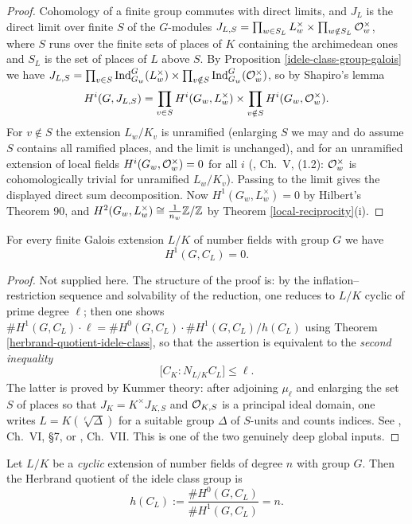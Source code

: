 \begin{proof}
Cohomology of a finite group commutes with direct limits, and $J_L$ is the
direct limit over finite $S$ of the $G$-modules
$J_{L,S}=\prod_{w\in S_L}L_w^\times\times\prod_{w\notin S_L}{\mathcal {O}}_w^\times$, where
$S$ runs over the finite sets of places of $K$ containing the archimedean ones
and $S_L$ is the set of places of $L$ above $S$.
By Proposition \ref{idele-class-group-galois} we have
$J_{L,S}=\prod_{v\in S}{\mathrm{Ind}}_{G_w}^G(L_w^\times)\times
\prod_{v\notin S}{\mathrm{Ind}}_{G_w}^G({\mathcal {O}}_w^\times)$, so by Shapiro's lemma
$$H^i(G,J_{L,S})=\prod_{v\in S}H^i(G_w,L_w^\times)\times
\prod_{v\notin S}H^i(G_w,{\mathcal {O}}_w^\times).$$
For $v\notin S$ the extension $L_w/K_v$ is unramified (enlarging $S$ we may and
do assume $S$ contains all ramified places, and the limit is unchanged), and for
an unramified extension of local fields $H^i(G_w,{\mathcal {O}}_w^\times)=0$ for all $i$
(\cite{Neu99}, Ch.~V, (1.2): ${\mathcal {O}}_w^\times$ is cohomologically trivial for
unramified $L_w/K_v$).
Passing to the limit gives the displayed direct sum decomposition.
Now $H^1(G_w,L_w^\times)=0$ by Hilbert's Theorem 90, and
$H^2(G_w,L_w^\times)\cong\frac1{n_w}{\mathbb {Z}}/{\mathbb {Z}}$ by
Theorem \ref{local-reciprocity}(i).
\end{proof}

\begin{thm}
\label{idele-class-H1-vanishes}
For every finite Galois extension $L/K$ of number fields with group $G$ we have
$$H^1(G,C_L)=0 .$$
\end{thm}

\begin{proof}
Not supplied here. The structure of the proof is:
by the inflation--restriction sequence and solvability of the reduction, one
reduces to $L/K$ cyclic of prime degree $\ell$; then one shows
$\#H^1(G,C_L)\cdot\ell=\#H^0(G,C_L)\cdot\#H^1(G,C_L)/h(C_L)$ using
Theorem \ref{herbrand-quotient-idele-class}, so that the assertion is
equivalent to the \emph{second inequality}
$$\big[C_K:N_{L/K}C_L\big]\leq\ell .$$
The latter is proved by Kummer theory: after adjoining $\mu_\ell$ and enlarging
the set $S$ of places so that $J_K=K^\times J_{K,S}$ and ${\mathcal {O}}_{K,S}$ is a
principal ideal domain, one writes $L=K(\sqrt[\ell]{\Delta})$ for a suitable
group $\Delta$ of $S$-units and counts indices.
See \cite{Neu99}, Ch.~VI, \S7, or \cite{Mil20}, Ch.~VII.
This is one of the two genuinely deep global inputs.
\end{proof}

\begin{thm}
\label{herbrand-quotient-idele-class}
Let $L/K$ be a \emph{cyclic} extension of number fields of degree $n$ with group
$G$. Then the Herbrand quotient of the idele class group is
$$h(C_L):=\frac{\#H^0(G,C_L)}{\#H^1(G,C_L)}=n .$$
\end{thm}

